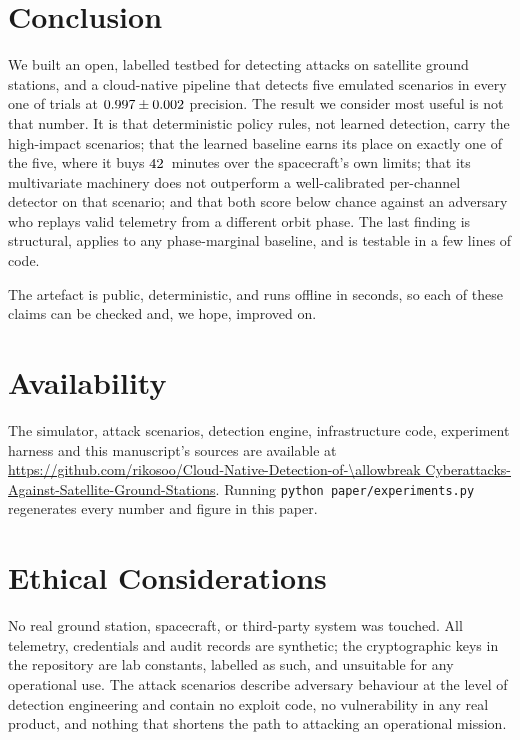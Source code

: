 \documentclass[conference]{IEEEtran}
\begin{document}
\section{Conclusion}

We built an open, labelled testbed for detecting attacks on satellite ground
stations, and a cloud-native pipeline that detects five emulated scenarios in
every one of \expNumSeeds{} trials at $0.997 \pm 0.002$
precision. The result we consider most useful is not that number. It is that
deterministic policy rules, not learned detection, carry the
high-impact scenarios; that the learned baseline earns its place on exactly one
of the five, where it buys $42$~minutes over the spacecraft's own
limits; that its multivariate machinery does not outperform a well-calibrated
per-channel detector on that scenario; and that both score below chance
against an adversary who replays valid telemetry from a different orbit phase.
The last finding is structural, applies to any phase-marginal baseline, and is
testable in a few lines of code.

The artefact is public, deterministic, and runs offline in seconds, so each of
these claims can be checked and, we hope, improved on.

\section*{Availability}

The simulator, attack scenarios, detection engine, infrastructure code,
experiment harness and this manuscript's sources are available at
\url{https://github.com/rikosoo/Cloud-Native-Detection-of-\allowbreak Cyberattacks-Against-Satellite-Ground-Stations}.
Running \texttt{python paper/experiments.py} regenerates every number and figure
in this paper.

\section*{Ethical Considerations}

No real ground station, spacecraft, or third-party system was touched. All
telemetry, credentials and audit records are synthetic; the cryptographic keys
in the repository are lab constants, labelled as such, and unsuitable for any
operational use. The attack scenarios describe adversary behaviour at the level
of detection engineering and contain no exploit code, no vulnerability in any
real product, and nothing that shortens the path to attacking an operational
mission.



\end{document}
